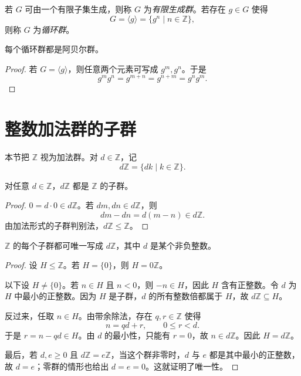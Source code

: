 若 $G$ 可由一个有限子集生成，则称 $G$ 为\emph{有限生成群}。若存在 $g\in G$ 使得
\[
  G=\langle g\rangle=\{g^n\mid n\in\mathbb Z\},
\]
则称 $G$ 为\emph{循环群}。

\begin{proposition}
每个循环群都是阿贝尔群。
\end{proposition}

\begin{proof}
若 $G=\langle g\rangle$，则任意两个元素可写成 $g^m,g^n$。于是
\[
  g^m g^n=g^{m+n}=g^{n+m}=g^n g^m.
\]
\end{proof}

\section{整数加法群的子群}

本节把 $\mathbb Z$ 视为加法群。对 $d\in\mathbb Z$，记
\[
  d\mathbb Z=\{dk\mid k\in\mathbb Z\}.
\]

\begin{proposition}
对任意 $d\in\mathbb Z$，$d\mathbb Z$ 都是 $\mathbb Z$ 的子群。
\end{proposition}

\begin{proof}
$0=d\cdot 0\in d\mathbb Z$。若 $dm,dn\in d\mathbb Z$，则
\[
  dm-dn=d(m-n)\in d\mathbb Z.
\]
由加法形式的子群判别法，$d\mathbb Z\leq\mathbb Z$。
\end{proof}

\begin{theorem}
$\mathbb Z$ 的每个子群都可唯一写成 $d\mathbb Z$，其中 $d$ 是某个非负整数。
\end{theorem}

\begin{proof}
设 $H\leq\mathbb Z$。若 $H=\{0\}$，则 $H=0\mathbb Z$。

以下设 $H\neq\{0\}$。若 $n\in H$ 且 $n<0$，则 $-n\in H$，因此 $H$ 含有正整数。令 $d$ 为 $H$ 中最小的正整数。因为 $H$ 是子群，$d$ 的所有整数倍都属于 $H$，故 $d\mathbb Z\subseteq H$。

反过来，任取 $n\in H$。由带余除法，存在 $q,r\in\mathbb Z$ 使得
\[
  n=qd+r,\qquad 0\leq r<d.
\]
于是 $r=n-qd\in H$。由 $d$ 的最小性，只能有 $r=0$，故 $n\in d\mathbb Z$。因此 $H=d\mathbb Z$。

最后，若 $d,e\geq 0$ 且 $d\mathbb Z=e\mathbb Z$，当这个群非零时，$d$ 与 $e$ 都是其中最小的正整数，故 $d=e$；零群的情形也给出 $d=e=0$。这就证明了唯一性。
\end{proof}
